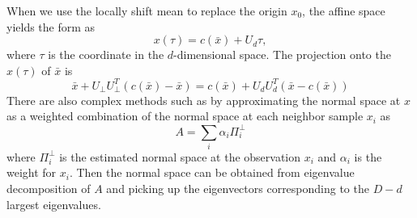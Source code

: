 \documentclass[aos,preprint]{imsart}
\theoremstyle{remark}
\begin{document}
When we use the locally shift mean to replace the origin $x_0$,  the affine space yields the form as
\[
x(\tau) = c(\bar{x}) + U_d\tau,
\]
where $\tau$ is the coordinate in the $d$-dimensional space. The projection onto the $x(\tau)$ of $\bar{x}$ is
 \[
\bar{x}+U_{\perp}U_{\perp}^T(c(\bar{x})-\bar{x}) = c(\bar{x})+ U_dU_d^T(\bar{x} -c(\bar{x}))
\]
There are also complex methods such as \cite{fefferman2018fitting,yao2019manifold} by approximating the normal space at $x$ as a weighted combination of the normal space at each neighbor sample $x_i$ as
\[
A = \sum_i \alpha_i \Pi_i^{\perp}
\]
where $\Pi_i^{\perp}$ is the estimated normal space at the observation $x_i$ and $\alpha_i$ is the weight for $x_i$.
Then the normal space can be obtained from eigenvalue decomposition of $A$ and picking up the eigenvectors corresponding to the $D-d$ largest eigenvalues.
%
%
%
\end{document}

